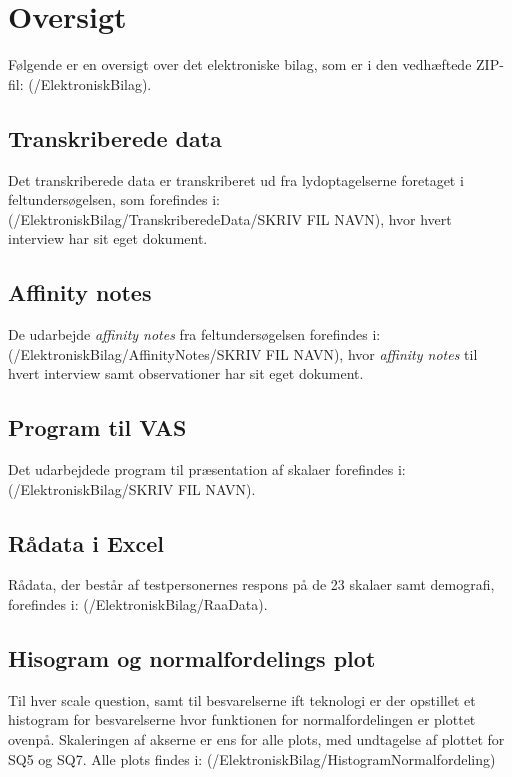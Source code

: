 \chapter{Oversigt}
\label{ElektroniskBilagOversigt}
%
Følgende er en oversigt over det elektroniske bilag, som er i den vedhæftede ZIP-fil: (/ElektroniskBilag).

\section{Transkriberede data}
\label{ElektroniskBilagTranskriberede}
%
Det transkriberede data er transkriberet ud fra lydoptagelserne foretaget i feltundersøgelsen, som forefindes i: (/ElektroniskBilag/TranskriberedeData/SKRIV FIL NAVN), hvor hvert interview har sit eget dokument. 

\section{Affinity notes}
\label{ElektroniskBilagAffinityNotes}
%
De udarbejde \textit{affinity notes} fra feltundersøgelsen forefindes i: (/ElektroniskBilag/AffinityNotes/SKRIV FIL NAVN), hvor \textit{affinity notes} til hvert interview samt observationer har sit eget dokument. 

\section{Program til VAS}
\label{ElektroniskBilagProgram}
%
Det udarbejdede program til præsentation af skalaer forefindes i: (/ElektroniskBilag/SKRIV FIL NAVN).

\section{Rådata i Excel}
\label{ElektroniskBilagExcel}
%
Rådata, der består af testpersonernes respons på de 23 skalaer samt demografi, forefindes i: (/ElektroniskBilag/RaaData).

\section{Hisogram og normalfordelings plot}
\label{ElektroniskBilagHistNormal}
%
Til hver scale question, samt til besvarelserne ift teknologi er der opstillet et histogram for besvarelserne hvor funktionen for normalfordelingen er plottet ovenpå.  
Skaleringen af akserne er ens for alle plots, med undtagelse af plottet for SQ5 og SQ7. Alle plots findes i: (/ElektroniskBilag/HistogramNormalfordeling)

